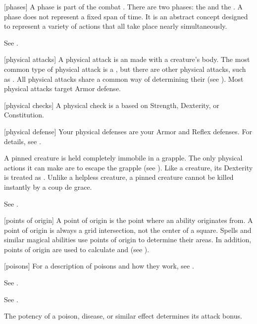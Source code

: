 [phases] A phase is part of the combat .
There are two phases: the  and the .
A phase does not represent a fixed span of time.
It is an abstract concept designed to represent a variety of actions that all take place nearly simultaneously.

 See .

[physical attacks] A physical attack is an  made with a creature's body.
The most common type of physical attack is a , but there are other physical attacks, such as .
All physical attacks share a common way of determining their  (see ).
Most physical attacks target Armor defense.

[physical checks] A physical check is a  based on Strength, Dexterity, or Constitution.

[physical defense] Your physical defenses are your Armor and Reflex defenses.
For details, see .

 A pinned creature is held completely immobile in a grapple.
The only physical actions it can make are to escape the grapple (see ).
Like a  creature, its Dexterity is treated as .
Unlike a helpless creature, a pinned creature cannot be killed instantly by a coup de grace.

 See .

[points of origin] A point of origin is the point where an ability originates from.
A point of origin is always a grid intersection, not the center of a square.
Spells and similar magical abilities use points of origin to determine their areas.
In addition, points of origin are used to calculate  and  (see ).

[poisons] For a description of poisons and how they work, see .

 See .

 See .

 The potency of a poison, disease, or similar effect determines its attack bonus.

